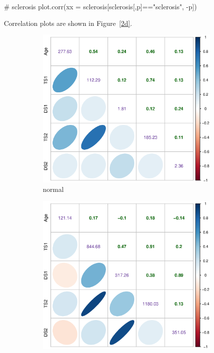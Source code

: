 \documentclass{article}
\begin{document}
\begin{enumerate}[leftmargin = 0 em, label = \arabic*., font = \bfseries]
\begin{enumerate}
\begin{rcode}
# sclerosis
plot.corr(xx = sclerosis[sclerosis[,p]=="sclerosis", -p])
		 \end{rcode}
		 Correlation plots are shown in Figure~\ref{2d}.
		 \begin{figure}[!htb]
		     \centering
		 	\begin{subfigure}[b]{0.5\textwidth}
		 	\includegraphics[width = \textwidth]{2dnormal.eps}
		 	\caption{normal}
		 	\end{subfigure}%
		 	\begin{subfigure}[b]{0.5\textwidth}
		 	\includegraphics[width = \textwidth]{2dsclerosis.eps}

\end{subfigure}
\end{figure}
\end{enumerate}
\end{enumerate}
\end{document}
